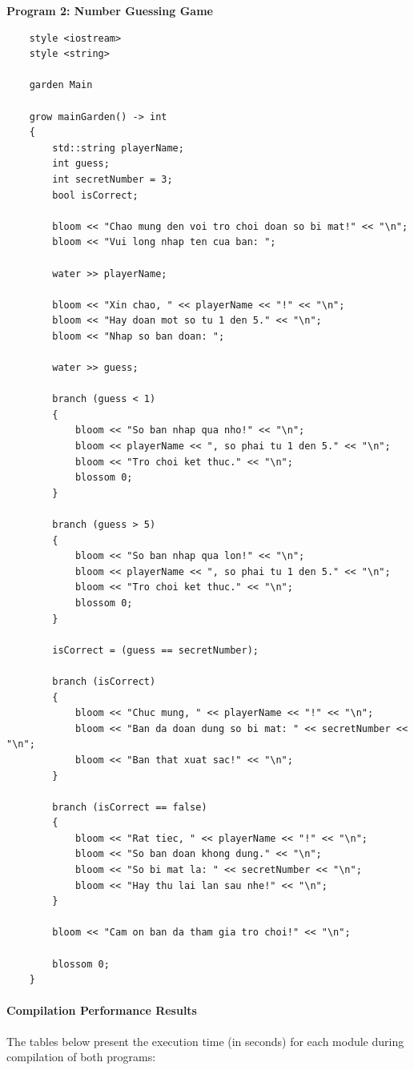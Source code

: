 \documentclass[conference]{IEEEtran}
\begin{document}
\textbf{Program 2: Number Guessing Game}
\begin{verbatim}
	style <iostream>
	style <string>
	
	garden Main
	
	grow mainGarden() -> int 
	{
		std::string playerName;
		int guess;
		int secretNumber = 3;
		bool isCorrect;
		
		bloom << "Chao mung den voi tro choi doan so bi mat!" << "\n";
		bloom << "Vui long nhap ten cua ban: ";
		
		water >> playerName;
		
		bloom << "Xin chao, " << playerName << "!" << "\n";
		bloom << "Hay doan mot so tu 1 den 5." << "\n";
		bloom << "Nhap so ban doan: ";
		
		water >> guess;
		
		branch (guess < 1) 
		{
			bloom << "So ban nhap qua nho!" << "\n";
			bloom << playerName << ", so phai tu 1 den 5." << "\n";
			bloom << "Tro choi ket thuc." << "\n";
			blossom 0;
		}
		
		branch (guess > 5) 
		{
			bloom << "So ban nhap qua lon!" << "\n";
			bloom << playerName << ", so phai tu 1 den 5." << "\n";
			bloom << "Tro choi ket thuc." << "\n";
			blossom 0;
		}
		
		isCorrect = (guess == secretNumber);
		
		branch (isCorrect) 
		{
			bloom << "Chuc mung, " << playerName << "!" << "\n";
			bloom << "Ban da doan dung so bi mat: " << secretNumber << "\n";
			bloom << "Ban that xuat sac!" << "\n";
		}
		
		branch (isCorrect == false) 
		{
			bloom << "Rat tiec, " << playerName << "!" << "\n";
			bloom << "So ban doan khong dung." << "\n";
			bloom << "So bi mat la: " << secretNumber << "\n";
			bloom << "Hay thu lai lan sau nhe!" << "\n";
		}
		
		bloom << "Cam on ban da tham gia tro choi!" << "\n";
		
		blossom 0;
	}
\end{verbatim}

\paragraph{Compilation Performance Results}
The tables below present the execution time (in seconds) for each module during compilation of both programs:
\end{document}
